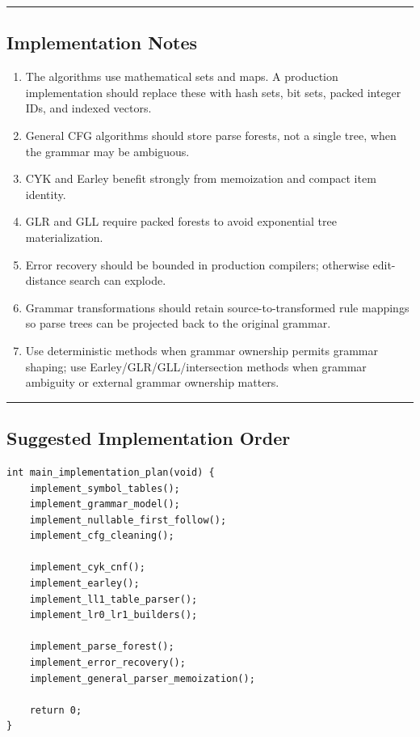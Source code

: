 \documentclass[10pt,letterpaper]{article}
\begin{document}
\medskip\hrule\medskip

\subsection*{Implementation Notes}

\begin{enumerate}
\item The algorithms use mathematical sets and maps. A production implementation should replace these with hash sets, bit sets, packed integer IDs, and indexed vectors.
\item General CFG algorithms should store parse forests, not a single tree, when the grammar may be ambiguous.
\item CYK and Earley benefit strongly from memoization and compact item identity.
\item GLR and GLL require packed forests to avoid exponential tree materialization.
\item Error recovery should be bounded in production compilers; otherwise edit-distance search can explode.
\item Grammar transformations should retain source-to-transformed rule mappings so parse trees can be projected back to the original grammar.
\item Use deterministic methods when grammar ownership permits grammar shaping; use Earley/GLR/GLL/intersection methods when grammar ambiguity or external grammar ownership matters.
\end{enumerate}

\medskip\hrule\medskip

\subsection*{Suggested Implementation Order}

\begin{verbatim}
int main_implementation_plan(void) {
    implement_symbol_tables();
    implement_grammar_model();
    implement_nullable_first_follow();
    implement_cfg_cleaning();

    implement_cyk_cnf();
    implement_earley();
    implement_ll1_table_parser();
    implement_lr0_lr1_builders();

    implement_parse_forest();
    implement_error_recovery();
    implement_general_parser_memoization();

    return 0;
}
\end{verbatim}
\end{document}

